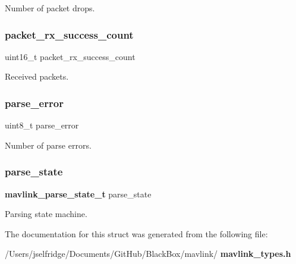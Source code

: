 Number of packet drops. 

\mbox{\label{struct____mavlink__status_a35104ed155d69237557f75df44e8c875}} 
\subsubsection{packet\+\_\+rx\+\_\+success\+\_\+count}
{\footnotesize\ttfamily uint16\+\_\+t packet\+\_\+rx\+\_\+success\+\_\+count}



Received packets. 

\mbox{\label{struct____mavlink__status_a00f0bf638777ef02791bdb2d21209d75}} 
\subsubsection{parse\+\_\+error}
{\footnotesize\ttfamily uint8\+\_\+t parse\+\_\+error}



Number of parse errors. 

\mbox{\label{struct____mavlink__status_a55340ddbc135478dc09ae22ba9d254b2}} 
\subsubsection{parse\+\_\+state}
{\footnotesize\ttfamily \textbf{ mavlink\+\_\+parse\+\_\+state\+\_\+t} parse\+\_\+state}



Parsing state machine. 



The documentation for this struct was generated from the following file\+:\begin{DoxyCompactItemize}
\item 
/\+Users/jselfridge/\+Documents/\+Git\+Hub/\+Black\+Box/mavlink/\textbf{ mavlink\+\_\+types.\+h}\end{DoxyCompactItemize}

